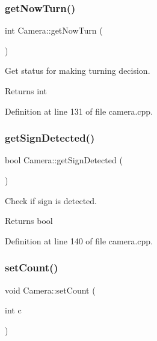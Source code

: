 \mbox{\label{class_camera_a6b27e3016f42ac8af96601426e009c1b}} 
\subsubsection{\texorpdfstring{get\+Now\+Turn()}{getNowTurn()}}
{\footnotesize\ttfamily int Camera\+::get\+Now\+Turn (\begin{DoxyParamCaption}{ }\end{DoxyParamCaption})}



Get status for making turning decision. 

\begin{DoxyReturn}{Returns}
int 
\end{DoxyReturn}


Definition at line 131 of file camera.\+cpp.

\mbox{\label{class_camera_a0f8951959a2822e6b729a9fe05b428ef}} 
\subsubsection{\texorpdfstring{get\+Sign\+Detected()}{getSignDetected()}}
{\footnotesize\ttfamily bool Camera\+::get\+Sign\+Detected (\begin{DoxyParamCaption}{ }\end{DoxyParamCaption})}



Check if sign is detected. 

\begin{DoxyReturn}{Returns}
bool 
\end{DoxyReturn}


Definition at line 140 of file camera.\+cpp.

\mbox{\label{class_camera_a3186b8e7cf648308237a2ba440379e34}} 
\subsubsection{\texorpdfstring{set\+Count()}{setCount()}}
{\footnotesize\ttfamily void Camera\+::set\+Count (\begin{DoxyParamCaption}\item[{int}]{c }\end{DoxyParamCaption})}



